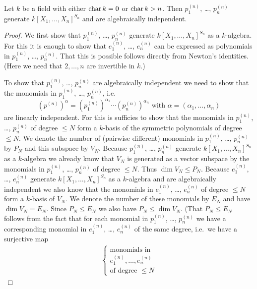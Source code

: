\begin{thrm}
  Let $k$ be a field with either $\operatorname{char} k = 0$ or $\operatorname{char} k > n$.
  Then $p^{(n)}_1$, \dots, $p^{(n)}_n$ generate $k[X_1, \dotsc, X_n]^{S_n}$ and are algebraically independent.
\end{thrm}
\begin{proof}
  We first show that $p^{(n)}_1$, \dots, $p^{(n)}_n$ generate $k[X_1, \dotsc, X_n]^{S_n}$ as a $k$-algebra.
  For this it is enough to show that $e^{(n)}_1$, \dots, $e^{(n)}_n$ can be expressed as polynomials in $p^{(n)}_1$, \dots, $p^{(n)}_n$.
  That this is possible follows directly from Newton’s identities.
  (Here we need that $2, \dotsc, n$ are invertible in $k$.)
  
  To show that $p^{(n)}_1$, \dots, $p^{(n)}_n$ are algebraically independent we need to show that the monomials in $p^{(n)}_1$, \dots, $p^{(n)}_n$, i.e.\
  \[
      \left(p^{(n)}\right)^\alpha
    = \left(p^{(n)}_1\right)^{\alpha_1} \dotsm \left(p^{(n)}_n\right)^{\alpha_n}
    \text{ with }
      \alpha
    = (\alpha_1, \dotsc, \alpha_n)
  \]
  are linearly independent.
  For this is sufficies to show that the monomials in $p^{(n)}_1$, \dots, $p^{(n)}_n$ of degree $\leq N$ form a $k$-basis of the symmetric polynomials of degree $\leq N$.
  We denote the number of (pairwise different) monomials in $p^{(n)}_1$, \dots, $p^{(n)}_n$ by $P_N$ and this subspace by $V_N$.
  Because $p^{(n)}_1$, \dots, $p^{(n)}_n$ generate $k[X_1, \dotsc, X_n]^{S_n}$ as a $k$-algebra we already know that $V_N$ is generated as a vector subspace by the monomials in $p^{(n)}_1$, \dots, $p^{(n)}_n$ of degree $\leq N$.
  Thus $\dim V_N \leq P_N$.
  Because $e^{(n)}_1$, \dots, $e^{(n)}_n$ generate $k[X_1, \dotsc, X_n]^{S_n}$ as a $k$-algebra and are algebraically independent we also know that the monomials in $e^{(n)}_1$, \dots, $e^{(n)}_n$ of degree $\leq N$ form a $k$-basis of $V_N$.
  We denote the number of these monomials by $E_N$ and have $\dim V_N = E_N$.
  Since $P_N \leq E_N$ we also have $P_N \leq \dim V_N$. (That $P_N \leq E_N$ follows from the fact that for each monomial in $p^{(n)}_1$, \dots, $p^{(n)}_n$ we have a corresponding monomial in $e^{(n)}_1$, \dots, $e^{(n)}_n$ of the same degree, i.e.\ we have a surjective map
\begin{align*}
  \left\{
    \begin{array}{c}
      \text{monomials in} \\
      e^{(n)}_1, \dotsc, e^{(n)}_n \\
      \text{of degree $\leq N$}
    \end{array}

\end{align*}
\end{proof}
